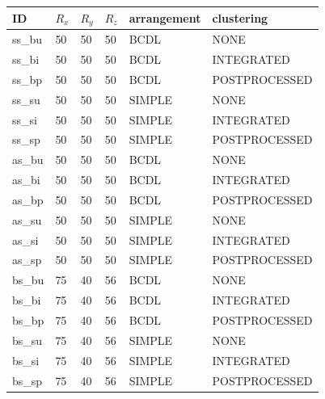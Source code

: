 \documentclass[]{article}
\begin{document}
\begin{table}[htb]
\centering
\begin{tabular}{|l|l|l|l|l|l|}
\hline
ID     & $R_x$ & $R_y$ & $R_z$ & arrangement & clustering    \\ \hline
ss\_bu & 50    & 50    & 50    & BCDL        & NONE          \\ \hline
ss\_bi & 50    & 50    & 50    & BCDL        & INTEGRATED    \\ \hline
ss\_bp & 50    & 50    & 50    & BCDL        & POSTPROCESSED \\ \hline
ss\_su & 50    & 50    & 50    & SIMPLE      & NONE          \\ \hline
ss\_si & 50    & 50    & 50    & SIMPLE      & INTEGRATED    \\ \hline
ss\_sp & 50    & 50    & 50    & SIMPLE      & POSTPROCESSED \\ \hline
as\_bu & 50    & 50    & 50    & BCDL        & NONE          \\ \hline
as\_bi & 50    & 50    & 50    & BCDL        & INTEGRATED    \\ \hline
as\_bp & 50    & 50    & 50    & BCDL        & POSTPROCESSED \\ \hline
as\_su & 50    & 50    & 50    & SIMPLE      & NONE          \\ \hline
as\_si & 50    & 50    & 50    & SIMPLE      & INTEGRATED    \\ \hline
as\_sp & 50    & 50    & 50    & SIMPLE      & POSTPROCESSED \\ \hline
bs\_bu & 75    & 40    & 56    & BCDL        & NONE          \\ \hline
bs\_bi & 75    & 40    & 56    & BCDL        & INTEGRATED    \\ \hline
bs\_bp & 75    & 40    & 56    & BCDL        & POSTPROCESSED \\ \hline
bs\_su & 75    & 40    & 56    & SIMPLE      & NONE          \\ \hline
bs\_si & 75    & 40    & 56    & SIMPLE      & INTEGRATED    \\ \hline
bs\_sp & 75    & 40    & 56    & SIMPLE      & POSTPROCESSED \\ \hline
\end{tabular}
\end{table}
\end{document}
